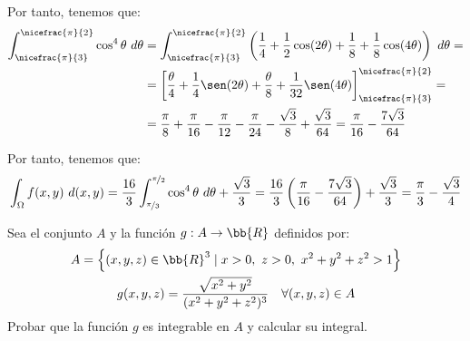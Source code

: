 \begin{ejercicio}
    Por tanto, tenemos que:
    \begin{align*}
        \int_{\nicefrac{\pi}{3}}^{\nicefrac{\pi}{2}}\cos^4\theta~d\theta &= \int_{\nicefrac{\pi}{3}}^{\nicefrac{\pi}{2}}\left(\dfrac{1}{4} + \dfrac{1}{2}\cos(2\theta) + \dfrac{1}{8} + \dfrac{1}{8}\cos(4\theta)\right)~d\theta =\\
        &= \left[\dfrac{\theta}{4} + \dfrac{1}{4}\sen(2\theta) + \dfrac{\theta}{8} + \dfrac{1}{32}\sen(4\theta)\right]_{\nicefrac{\pi}{3}}^{\nicefrac{\pi}{2}} =\\
        &= \dfrac{\pi}{8} + \dfrac{\pi}{16} -\dfrac{\pi}{12} - \dfrac{\pi}{24} - \dfrac{\sqrt{3}}{8} + \dfrac{\sqrt{3}}{64}
        = \dfrac{\pi}{16} - \dfrac{7\sqrt{3}}{64}
    \end{align*}

    Por tanto, tenemos que:
    \begin{align*}
        \int_{\Omega} f(x, y)~d(x, y) = \dfrac{16}{3}\int_{\nicefrac{\pi}{3}}^{\nicefrac{\pi}{2}}\cos^4\theta~d\theta + \dfrac{\sqrt{3}}{3} = \dfrac{16}{3}\left(\dfrac{\pi}{16} - \dfrac{7\sqrt{3}}{64}\right) + \dfrac{\sqrt{3}}{3} = \dfrac{\pi}{3} - \dfrac{\sqrt{3}}{4}
    \end{align*}
\end{ejercicio}



\begin{ejercicio}
    Sea el conjunto $A$ y la función $g:A\to \bb{R}$ definidos por:
    \begin{gather*}
        A=\left\{(x,y,z)\in \bb{R}^3 \mid x>0,~z>0,~x^2+y^2+z^2> 1\right\}\\
        g(x,y,z) = \dfrac{\sqrt{x^2+y^2}}{(x^2+y^2+z^2)^{3}} \quad \forall (x,y,z)\in A
    \end{gather*}
    Probar que la función \( g \) es integrable en \( A \) y calcular su integral.
\end{ejercicio}
